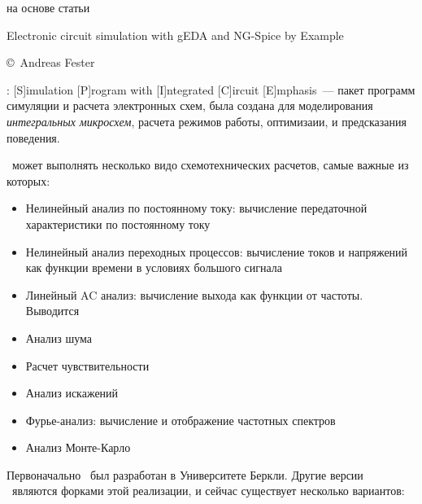 \label{spice}\secdown\secdown

на основе статьи



Electronic circuit simulation with gEDA and NG-Spice by Example

\copyright\ Andreas Fester

\bigskip

\prog{\spice}: [S]imulation [P]rogram with [I]ntegrated [C]ircuit
[E]mphasis\ --- пакет программ симуляции и расчета электронных схем,
была создана для моделирования \emph{интегральных микросхем}, расчета режимов
работы, оптимизаии, и предсказания поведения.

\bigskip
\spice\ может выполнять несколько видо схемотехнических расчетов, самые важные
из которых:

\begin{itemize}
  \item
Нелинейный анализ по постоянному току: вычисление передаточной характеристики по
постоянному току
  \item 
Нелинейный анализ переходных процессов: вычисление токов и напряжений как
функции времени в условиях большого сигнала
  \item 
Линейный AC анализ: вычисление выхода как функции от частоты. Выводится
  \item 
Анализ шума 
  \item
Расчет чувствительности
  \item 
Анализ искажений 
  \item
Фурье-анализ: вычисление и отображение частотных спектров   
  \item 
Анализ Монте-Карло
\end{itemize}  

\bigskip


Первоначально \spice\ был разработан в Университете Беркли. Другие версии
\spice\ являются форками этой реализации, и сейчас существует несколько
вариантов:

